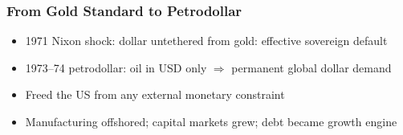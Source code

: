 \begin{frame}[fragile]\frametitle{From Gold Standard to Petrodollar}



  \begin{itemize}
    \item 1971 Nixon shock: dollar untethered from gold: effective sovereign default
    \item 1973--74 petrodollar: oil in USD only $\Rightarrow$ permanent global dollar demand
    \item Freed the US from any external monetary constraint
    \item Manufacturing offshored; capital markets grew; debt became growth engine
  \end{itemize}
\end{frame}

